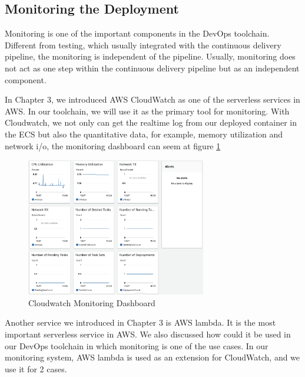 \subsection{Monitoring the Deployment}
Monitoring is one of the important components in the DevOps toolchain. Different from testing, which usually integrated with the continuous delivery pipeline, the monitoring is independent of the pipeline. Usually, monitoring does not act as one step within the continuous delivery pipeline but as an independent component.
\par
In Chapter 3, we introduced AWS CloudWatch as one of the serverless services in AWS. In our toolchain, we will use it as the primary tool for monitoring. With Cloudwatch, we not only can get the realtime log from our deployed container in the ECS but also the quantitative data, for example, memory utilization and network i/o, the monitoring dashboard can seem at figure \ref{fig:monitoring}
\begin{figure}[h]
 \centering
 \includegraphics[width=0.70\textwidth]{pics/monitoring.png}
 \caption{Cloudwatch Monitoring Dashboard}
 \label{fig:monitoring}
\end{figure}
Another service we introduced in Chapter 3 is AWS lambda. It is the most important serverless service in AWS. We also discussed how could it be used in our DevOps toolchain in which monitoring is one of the use cases. In our monitoring system, AWS lambda is used as an extension for CloudWatch, and we use it for 2 cases.
